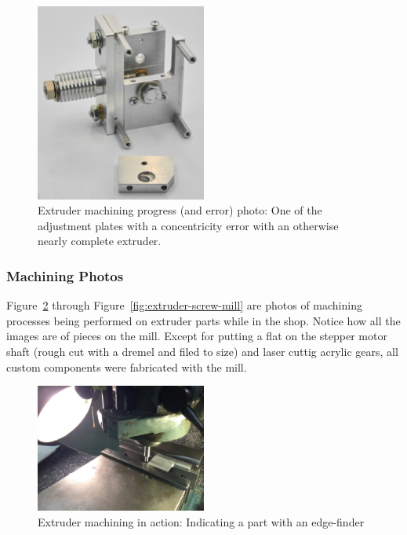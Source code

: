 \begin{figure}[h!]
\centering
\includegraphics[width=0.5\textwidth]{./figures/extruder-mistake-2}
\caption{Extruder machining progress (and error) photo: One of the adjustment plates with a concentricity error with an otherwise nearly complete extruder.}
\label{fig:extruder-mistake-2}
\end{figure}

\clearpage

\subsubsection{Machining Photos}


\indent

Figure~\ref{fig:extruder-edge-finder} through Figure~\ref{fig:extruder-screw-mill} are photos of machining processes being performed on extruder parts while in the shop. Notice how all the images are of pieces on the mill. Except for putting a flat on the stepper motor shaft (rough cut with a dremel and filed to size) and laser cuttig acrylic gears, all custom components were fabricated with the mill.\\

\begin{figure}[h!]
\centering
\includegraphics[width=0.5\textwidth]{./figures/extruder-edge-finder}
\caption{Extruder machining in action: Indicating a part with an edge-finder}
\label{fig:extruder-edge-finder}
\end{figure}

